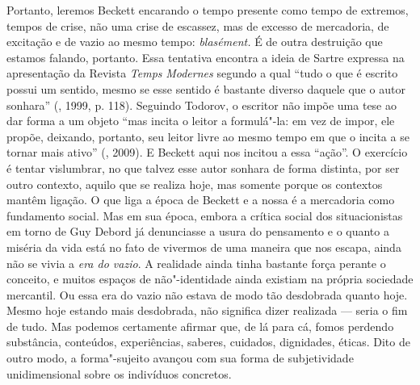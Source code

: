 Portanto, leremos Beckett encarando o tempo presente como tempo de
extremos, tempos de crise, não uma crise de escassez, mas de excesso de
mercadoria, de excitação e de vazio ao mesmo tempo: \emph{blasément.} É
de outra destruição que estamos falando, portanto. Essa tentativa
encontra a ideia de Sartre expressa na apresentação da Revista
\emph{Temps} \emph{Modernes} segundo a qual ``tudo o que é escrito
possui um sentido, mesmo se esse sentido é bastante diverso daquele que
o autor sonhara'' (, 1999, p. 118). Seguindo Todorov, o escritor
não impõe uma tese ao dar forma a um objeto ``mas incita o leitor a
formulá"-la: em vez de impor, ele propõe, deixando, portanto, seu leitor
livre ao mesmo tempo em que o incita a se tornar mais ativo'' (,
2009). E Beckett aqui nos incitou a essa ``ação''. O exercício é tentar
vislumbrar, no que talvez esse autor sonhara de forma distinta, por ser
outro contexto, aquilo que se realiza hoje, mas somente porque os
contextos mantêm ligação. O que liga a época de Beckett e a nossa é a
mercadoria como fundamento social. Mas em sua época, embora a crítica
social dos situacionistas em torno de Guy Debord já denunciasse a usura
do pensamento e o quanto a miséria da vida está no fato de vivermos de
uma maneira que nos escapa, ainda não se vivia a \emph{era do vazio}. A
realidade ainda tinha bastante força perante o conceito, e muitos
espaços de não"-identidade ainda existiam na própria sociedade mercantil.
Ou essa era do vazio não estava de modo tão desdobrada quanto hoje.
Mesmo hoje estando mais desdobrada, não significa dizer realizada ---
seria o fim de tudo. Mas podemos certamente afirmar que, de lá para cá,
fomos perdendo substância, conteúdos, experiências, saberes, cuidados,
dignidades, éticas. Dito de outro modo, a forma"-sujeito avançou com sua
forma de subjetividade unidimensional sobre os indivíduos concretos.

